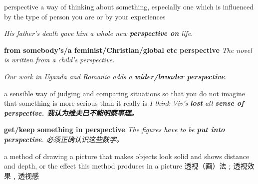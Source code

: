 \begin{wordRef}{perspective}
    a way of thinking about something, especially one which is influenced by the type of person you are or by your experiences

    \textit{His father’s death gave him a whole new \textbf{perspective on} life.}
    
    \textbf{from somebody’s/a feminist/Christian/global etc perspective}
    \textit{The novel is written from a child’s perspective.}

    \textit{Our work in Uganda and Romania adds a \textbf{wider/broader perspective}.}

    a sensible way of judging and comparing situations so that you do not imagine that something is more serious than it really is
    \textit{I think Viv’s \textbf{lost} all \textbf{sense of perspective. 我认为维夫已不能明察事理。}}

    \textbf{get/keep something in perspective}
    \textit{The figures have to be \textbf{put into perspective}. 必须正确认识这些数字。}

    a method of drawing a picture that makes objects look solid and shows distance and depth, or the effect this method produces in a picture 透视（画）法﹔透视效果﹐透视感
\end{wordRef}

